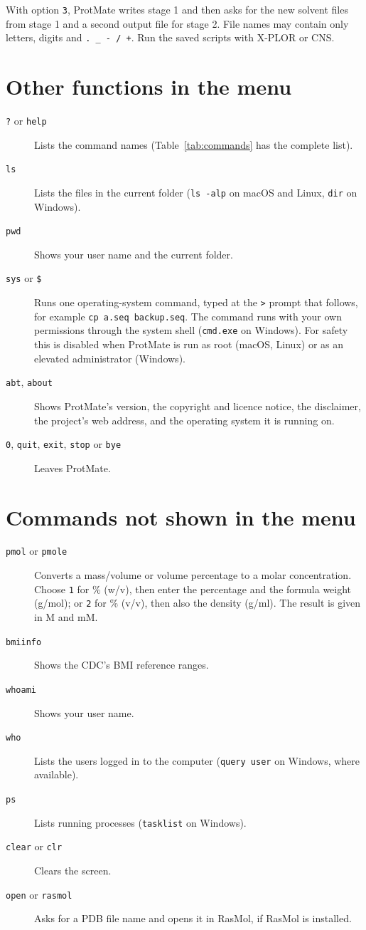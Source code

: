 \documentclass[11pt,a4paper,oneside]{report}
\newcommand{\cmd}[1]{\texttt{#1}}            %
\begin{document}
With option \cmd{3}, ProtMate writes stage 1 and then asks for the new solvent files from stage 1
and a second output file for stage 2. File names may contain only letters, digits and
\cmd{. \_ - / +}. Run the saved scripts with X-PLOR or CNS.

\section{Other functions in the menu}

\begin{description}
  \item[\cmd{?} or \cmd{help}] Lists the command names (Table~\ref{tab:commands} has the complete
        list).
  \item[\cmd{ls}] Lists the files in the current folder (\cmd{ls -alp} on macOS and Linux, \cmd{dir}
        on Windows).
  \item[\cmd{pwd}] Shows your user name and the current folder.
  \item[\cmd{sys} or \cmd{\$}] Runs one operating-system command, typed at the \cmd{>} prompt that
        follows, for example \cmd{cp a.seq backup.seq}. The command runs with your own permissions
        through the system shell (\cmd{cmd.exe} on Windows). For safety this is disabled when
        ProtMate is run as root (macOS, Linux) or as an elevated administrator (Windows).
  \item[\cmd{abt}, \cmd{about}] Shows ProtMate's version, the copyright and licence notice, the
        disclaimer, the project's web address, and the operating system it is running on.
  \item[\cmd{0}, \cmd{quit}, \cmd{exit}, \cmd{stop} or \cmd{bye}] Leaves ProtMate.
\end{description}

\section{Commands not shown in the menu}

\begin{description}
  \item[\cmd{pmol} or \cmd{pmole}] Converts a mass/volume or volume percentage to a molar
        concentration. Choose \cmd{1} for \% (w/v), then enter the percentage and the formula
        weight (g/mol); or \cmd{2} for \% (v/v), then also the density (g/ml). The result is given in
        M and mM.
  \item[\cmd{bmiinfo}] Shows the CDC's BMI reference ranges.
  \item[\cmd{whoami}] Shows your user name.
  \item[\cmd{who}] Lists the users logged in to the computer (\cmd{query user} on Windows, where
        available).
  \item[\cmd{ps}] Lists running processes (\cmd{tasklist} on Windows).
  \item[\cmd{clear} or \cmd{clr}] Clears the screen.
  \item[\cmd{open} or \cmd{rasmol}] Asks for a PDB file name and opens it in RasMol, if RasMol is
        installed.
\end{description}
\end{document}
